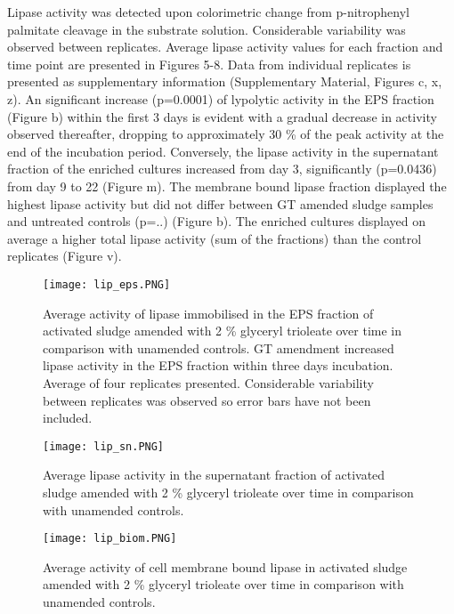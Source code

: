 \documentclass[twoside]{article}
\begin{document}
Lipase activity was detected upon colorimetric change from p-nitrophenyl palmitate cleavage in the substrate solution. 
Considerable variability was observed between replicates. Average lipase activity values for each fraction and time point are presented in Figures 5-8. Data from individual replicates is presented as supplementary information (Supplementary Material,  Figures c, x, z).
An significant increase (p=0.0001) of lypolytic activity in the EPS fraction (Figure b) within the first 3 days is evident with a gradual decrease in activity observed thereafter, dropping to approximately 30 \% of the peak activity at  the end of the incubation period. 
Conversely, the lipase activity in the supernatant fraction of the enriched cultures increased from day 3,  significantly (p=0.0436) from day 9 to 22 (Figure m). The membrane bound lipase fraction displayed the highest lipase activity but did not differ between GT amended sludge samples and untreated controls (p=..) (Figure b). The enriched cultures displayed on average a higher total lipase activity (sum of the fractions) than the control replicates (Figure v).
                                                                                                                                                                                                                                         
\begin{figure}
\texttt{[image: lip\_eps.PNG]}
\caption{Average activity of lipase immobilised in the EPS fraction of activated sludge amended with 2 \% glyceryl trioleate over time in comparison with unamended controls. GT amendment increased lipase activity in the EPS fraction within three days incubation. Average of four replicates presented. Considerable variability between replicates was observed so error bars have not been included.}
\end{figure}
\begin{figure}
\texttt{[image: lip\_sn.PNG]}
\caption{Average lipase activity in the supernatant fraction of activated sludge amended with 2 \% glyceryl trioleate over time in comparison with unamended controls.}
\end{figure}

\begin{figure}
\texttt{[image: lip\_biom.PNG]}
\caption{Average activity of cell membrane bound lipase in activated sludge amended with 2 \% glyceryl trioleate over time in comparison with unamended controls.}
\end{figure}
\end{document}
